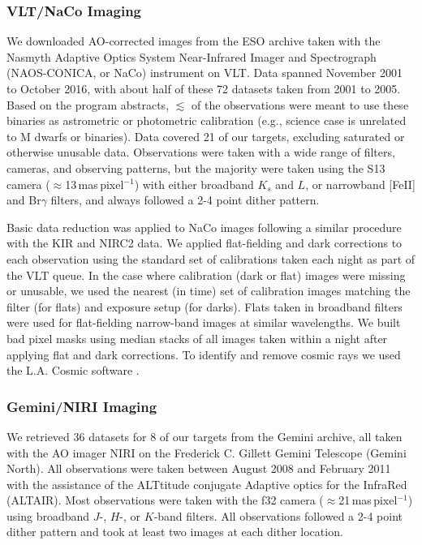 \documentclass[twocolumn]{aastex62}
\begin{document}
\subsubsection{VLT/NaCo Imaging}

We downloaded AO-corrected images from the ESO archive taken with the Nasmyth Adaptive Optics System Near-Infrared Imager and Spectrograph (NAOS-CONICA, or NaCo) instrument on VLT. Data spanned November 2001 to October 2016, with about half of these 72 datasets taken from 2001 to 2005. Based on the program abstracts, $\lesssim$ of the observations were meant to use these binaries as astrometric or photometric calibration (e.g., science case is unrelated to M dwarfs or binaries). Data covered 21 of our targets, excluding saturated or otherwise unusable data. Observations were taken with a wide range of filters, cameras, and observing patterns, but the majority were taken using the S13 camera ($\approx$13\,mas\,pixel$^{-1}$) with either broadband $K_s$ and $L$, or narrowband [FeII] and Br$\gamma$ filters, and always followed a 2-4 point dither pattern. 

Basic data reduction was applied to NaCo images following a similar procedure with the KIR and NIRC2 data. We applied flat-fielding and dark corrections to each observation using the standard set of calibrations taken each night as part of the VLT queue. In the case where calibration (dark or flat) images were missing or unusable, we used the nearest (in time) set of calibration images matching the filter (for flats) and exposure setup (for darks). Flats taken in broadband filters were used for flat-fielding narrow-band images at similar wavelengths. We built bad pixel masks using median stacks of all images taken within a night after applying flat and dark corrections. To identify and remove cosmic rays we used the L.A. Cosmic software \citep{2001PASP..113.1420V}.


\subsubsection{Gemini/NIRI Imaging}
We retrieved 36 datasets for 8 of our targets from the Gemini archive, all taken with the AO imager NIRI \citep{2003PASP..115.1388H} on the Frederick C. Gillett Gemini Telescope (Gemini North). All observations were taken between August 2008 and February 2011 with the assistance of the ALTtitude conjugate Adaptive optics for the InfraRed (ALTAIR). Most observations were taken with the f32 camera ($\approx$21\,mas\,pixel$^{-1}$) using broadband $J$-, $H$-, or $K$-band filters. All observations followed a 2-4 point dither pattern and took at least two images at each dither location. 
\end{document}
